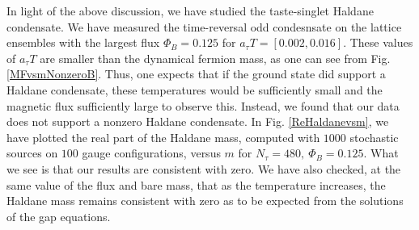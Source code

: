 \documentclass[aps,prd,twocolumn,showpacs,superscriptaddress,groupedaddress]{revtex4}  %
\begin{document}
In light of the above discussion, we have studied the taste-singlet Haldane condensate. We have measured the time-reversal odd condesnsate on the lattice ensembles with the largest flux $\Phi_B=0.125$ for $a_{\tau} T = [0.002, 0.016]$. These values of $a_{\tau}T$ are smaller than the dynamical fermion mass, as one can see from Fig. \ref{MFvsmNonzeroB}. Thus, one expects that if the ground state did support a Haldane condensate, these temperatures would be sufficiently small and the magnetic flux sufficiently large to observe this. Instead, we found that our data does not support a nonzero Haldane condensate. In Fig. \ref{ReHaldanevsm},  we have plotted the real part of the Haldane mass, computed with $1000$ stochastic sources on $100$ gauge configurations, versus $m$ for $N_{\tau}=480,~\Phi_B=0.125$. What we see is that our results are consistent with zero. We have also checked, at the same value of the flux and bare mass, that as the temperature increases, the Haldane mass remains consistent with zero as to be expected from the solutions of the gap equations. 


\end{document}

